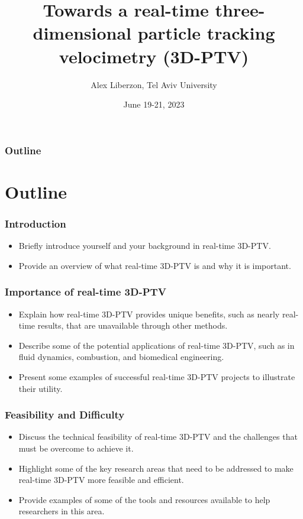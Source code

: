 \documentclass[aspectratio=43]{beamer}
\title{Towards a real-time three-dimensional particle tracking velocimetry (3D-PTV)}
\date{June 19-21, 2023}
\author[Liberzon]{Alex Liberzon, Tel Aviv University}
\begin{document}
\begin{frame}
    \titlepage
\end{frame}

\begin{frame}\frametitle{Outline}
    \begin{card}	
    \tableofcontents
    \end{card}
\end{frame}

\section{Outline}
\begin{frame}
\frametitle{Introduction}
\begin{itemize}
\item Briefly introduce yourself and your background in real-time 3D-PTV.
\item Provide an overview of what real-time 3D-PTV is and why it is important.
\end{itemize}
\end{frame}

\begin{frame}
\frametitle{Importance of real-time 3D-PTV}
\begin{itemize}
\item Explain how real-time 3D-PTV provides unique benefits, such as nearly real-time results, that are unavailable through other methods.
\item Describe some of the potential applications of real-time 3D-PTV, such as in fluid dynamics, combustion, and biomedical engineering.
\item Present some examples of successful real-time 3D-PTV projects to illustrate their utility.
\end{itemize}
\end{frame}

\begin{frame}
\frametitle{Feasibility and Difficulty}
\begin{itemize}
\item Discuss the technical feasibility of real-time 3D-PTV and the challenges that must be overcome to achieve it.
\item Highlight some of the key research areas that need to be addressed to make real-time 3D-PTV more feasible and efficient.
\item Provide examples of some of the tools and resources available to help researchers in this area.
\end{itemize}
\end{frame}
\end{document}
